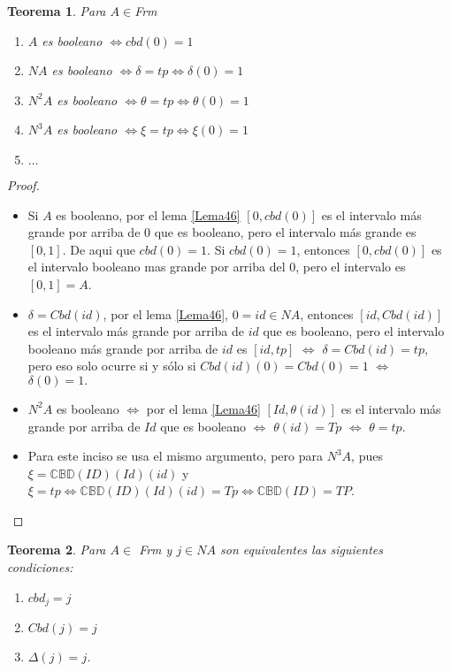 \documentclass[12pt,letterpaper,titlepage]{article}
\newtheorem{thm}{Teorema}
\theoremstyle{definition}
\newcommand\<{\langle}
\renewcommand\>{\rangle}
\begin{document}
\begin{thm}
Para $A\in$\textit{Frm}
\begin{enumerate}
\item $A$ es booleano $\Leftrightarrow cbd(0)=1$
\item $NA$ es booleano $\Leftrightarrow \delta=tp\Leftrightarrow\delta(0)=1$
\item $N^2A$ es booleano $\Leftrightarrow \theta=tp\Leftrightarrow\theta(0)=1$
\item $N^3A$ es booleano $\Leftrightarrow \xi=tp\Leftrightarrow\xi(0)=1$
\item $\ldots$
\end{enumerate}
\end{thm}

\begin{proof}
\begin{itemize}
\item[1.] Si $A$ es booleano, por el lema \ref{Lema46} $[0,cbd(0)]$ es el intervalo más grande por arriba de 0 que es booleano, pero el intervalo más grande es $[0,1]$. De aqui que $cbd(0)=1$. Si $cbd(0)=1$, entonces  $[0,cbd(0)]$ es el intervalo booleano mas grande por arriba del 0, pero el intervalo es $[0,1]=A$.
\item[2.] $\delta=Cbd(id)$, por el lema \ref{Lema46}, $0=id\in NA$, entonces $[id, Cbd(id)]$ es el intervalo más grande por arriba de $id$ que es booleano, pero el intervalo booleano más grande por arriba de $id$ es $[id, tp]$ $\Leftrightarrow$ $\delta=Cbd(id)=tp$, pero eso solo ocurre si y sólo si $Cbd(id)(0)=Cbd(0)=1$ $\Leftrightarrow$ $\delta(0)=1.$
\item[3.] $N^2A$ es booleano $\Leftrightarrow$ por el lema \ref{Lema46} $[Id, \theta(id)]$ es el intervalo más grande por arriba de $Id$ que es booleano $\Leftrightarrow$ $\theta(id)=Tp$ $\Leftrightarrow$ $\theta=tp$.
\item[4.] Para este inciso se usa el mismo argumento, pero para $N^3A$, pues $\xi=\mathbb{CBD}(ID)(Id)(id)$ y $\xi=tp\Leftrightarrow \mathbb{CBD}(ID)(Id)(id)=Tp\Leftrightarrow \mathbb{CBD}(ID)=TP$.
\end{itemize}
\end{proof}

\begin{thm}
Para $A\in$ \textit{Frm} y $j\in NA$ son equivalentes las siguientes condiciones:
\begin{enumerate}
\item $cbd_j=j$
\item $Cbd(j)=j$
\item $\Delta(j)=j$.
\end{enumerate}
\end{thm}
\end{document}
